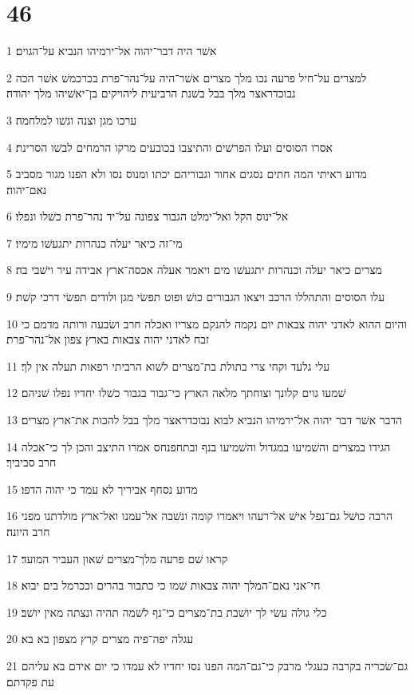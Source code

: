\chapter{46}

\par 1 אשׁר היה דבר־יהוה אל־ירמיהו הנביא על־הגוים׃
\par 2 למצרים על־חיל פרעה נכו מלך מצרים אשׁר־היה על־נהר־פרת בכרכמשׁ אשׁר הכה נבוכדראצר מלך בבל בשׁנת הרביעית ליהויקים בן־יאשׁיהו מלך יהודה׃
\par 3 ערכו מגן וצנה וגשׁו למלחמה׃
\par 4 אסרו הסוסים ועלו הפרשׁים והתיצבו בכובעים מרקו הרמחים לבשׁו הסרינת׃
\par 5 מדוע ראיתי המה חתים נסגים אחור וגבוריהם יכתו ומנוס נסו ולא הפנו מגור מסביב נאם־יהוה׃
\par 6 אל־ינוס הקל ואל־ימלט הגבור צפונה על־יד נהר־פרת כשׁלו ונפלו׃
\par 7 מי־זה כיאר יעלה כנהרות יתגעשׁו מימיו׃
\par 8 מצרים כיאר יעלה וכנהרות יתגעשׁו מים ויאמר אעלה אכסה־ארץ אבידה עיר וישׁבי בה׃
\par 9 עלו הסוסים והתהללו הרכב ויצאו הגבורים כושׁ ופוט תפשׂי מגן ולודים תפשׂי דרכי קשׁת׃
\par 10 והיום ההוא לאדני יהוה צבאות יום נקמה להנקם מצריו ואכלה חרב ושׂבעה ורותה מדמם כי זבח לאדני יהוה צבאות בארץ צפון אל־נהר־פרת׃
\par 11 עלי גלעד וקחי צרי בתולת בת־מצרים לשׁוא הרביתי רפאות תעלה אין לך׃
\par 12 שׁמעו גוים קלונך וצוחתך מלאה הארץ כי־גבור בגבור כשׁלו יחדיו נפלו שׁניהם׃
\par 13 הדבר אשׁר דבר יהוה אל־ירמיהו הנביא לבוא נבוכדראצר מלך בבל להכות את־ארץ מצרים׃
\par 14 הגידו במצרים והשׁמיעו במגדול והשׁמיעו בנף ובתחפנחס אמרו התיצב והכן לך כי־אכלה חרב סביביך׃
\par 15 מדוע נסחף אביריך לא עמד כי יהוה הדפו׃
\par 16 הרבה כושׁל גם־נפל אישׁ אל־רעהו ויאמרו קומה ונשׁבה אל־עמנו ואל־ארץ מולדתנו מפני חרב היונה׃
\par 17 קראו שׁם פרעה מלך־מצרים שׁאון העביר המועד׃
\par 18 חי־אני נאם־המלך יהוה צבאות שׁמו כי כתבור בהרים וככרמל בים יבוא׃
\par 19 כלי גולה עשׂי לך יושׁבת בת־מצרים כי־נף לשׁמה תהיה ונצתה מאין יושׁב׃
\par 20 עגלה יפה־פיה מצרים קרץ מצפון בא בא׃
\par 21 גם־שׂכריה בקרבה כעגלי מרבק כי־גם־המה הפנו נסו יחדיו לא עמדו כי יום אידם בא עליהם עת פקדתם׃
